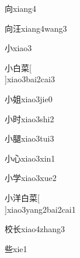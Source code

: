 \begin{verbete}[6]{向}{xiang4}
\end{verbete}

\begin{verbete}[6;7]{向汪}{xiang4wang3}
\end{verbete}

\begin{verbete}[3]{小}{xiao3}
\end{verbete}

\begin{verbete}[3;5;11]{小白菜}[\\]{xiao3bai2cai3}
\end{verbete}

\begin{verbete}[3;8]{小姐}{xiao3jie0}
\end{verbete}

\begin{verbete}[3;7]{小时}{xiao3shi2}
\end{verbete}

\begin{verbete}[3;13]{小腿}{xiao3tui3}
\end{verbete}

\begin{verbete}[3;4]{小心}{xiao3xin1}
\end{verbete}

\begin{verbete}[3;8]{小学}{xiao3xue2}
\end{verbete}

\begin{verbete}[3;9;5;12]{小洋白菜}[\\]{xiao3yang2bai2cai1}
\end{verbete}

\begin{verbete}[10;4]{校长}{xiao4zhang3}
\end{verbete}

\begin{verbete}[8]{些}{xie1}
\end{verbete}

